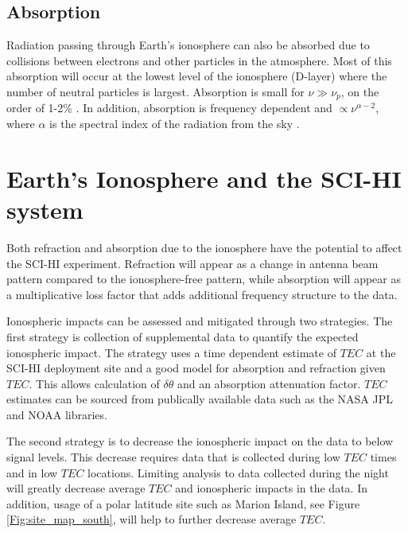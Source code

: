 \subsection{Absorption}

Radiation passing through Earth's ionosphere can also be absorbed due to collisions between electrons and other particles in the atmosphere. Most of this absorption will occur at the lowest level of the ionosphere (D-layer) where the number of neutral particles is largest. Absorption is small for $\nu \gg \nu_p$, on the order of 1-2\% \cite{vedantham_2014}. In addition, absorption is frequency dependent and $\propto \nu^{\alpha -2}$, where $\alpha$ is the spectral index of the radiation from the sky \cite{vedantham_2014}. 



\section{Earth's Ionosphere and the SCI-HI system}

Both refraction and absorption due to the ionosphere have the potential to affect the SCI-HI experiment. Refraction will appear as a change in antenna beam pattern compared to the ionosphere-free pattern, while absorption will appear as a multiplicative loss factor that adds additional frequency structure to the data. 

Ionospheric impacts can be assessed and mitigated through two strategies. The first strategy is collection of supplemental data to quantify the expected ionospheric impact. The strategy uses a time dependent estimate of $TEC$ at the SCI-HI deployment site and a good model for absorption and refraction given $TEC$. This allows calculation of $\delta \theta$ and an absorption attenuation factor. $TEC$ estimates can be sourced from publically available data such as the NASA JPL and NOAA libraries. 

The second strategy is to decrease the ionospheric impact on the data to below \cm signal levels. This decrease requires data that is collected during low $TEC$ times and in low $TEC$ locations. Limiting analysis to data collected during the night will greatly decrease average $TEC$ and ionospheric impacts in the data. In addition, usage of a polar latitude site such as Marion Island, see Figure \ref{Fig:site_map_south}, will help to further decrease average $TEC$.

